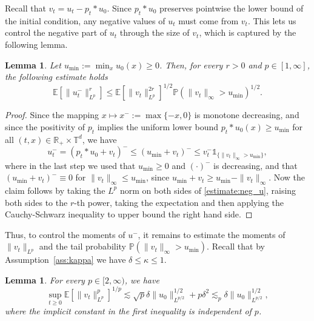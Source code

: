 \documentclass[a4paper,12pt]{article}
\newtheorem{lemma}[theorem]{Lemma}
\begin{document}
Recall that $v_t = u_t - p_t \ast u_0$. Since 
$p_t \ast u_0$ preserves pointwise the lower bound of the initial condition, 
any negative values of $u_t$ must come from $v_t$. This lets us control the negative part of $u_t$ through the size of $v_t$, which is captured by the following lemma. 

\begin{lemma}
  \label{lem:negative-u-moments}Let $u_{\min} := \min_x u_0 (x) \geq 0$. Then, for every $r > 0$ and $p \in [1,\infty]$, 
the following estimate holds
   \[ \mathbb{E} [\| u^-_t \|_{L^p}^r] \leq \mathbb{E} [\| v_t \|_{L^p}^{2
     r}]^{1 / 2} \mathbb{P} (\| v_t \|_{\infty} > u_{\min})^{1 / 2} . \]
\end{lemma}

\begin{proof}
    Since the mapping $x \mapsto x^-:=\max\{-x,0\}$ is monotone decreasing, 
  and since the positivity of $p_t$ implies the uniform lower bound $p_t \ast u_0 (x)\geq u_{\min}$ for all $(t,x) \in \mathbb R_+ \times \mathbb{T}^d$,
  we have 
  \begin{equation}\label{estimate:neg_u}
       u_t^- =(p_t \ast u_0 + v_t)^- \leq  (u_{\min} + v_t)^- \leq v_t^- \mathds{1}_{\{\|v_t\|_\infty > u_{\min}\}},
  \end{equation}
  where in the last step we used that $u_{\min}\ge 0$ and $(\cdot)^-$ is decreasing, and that $(u_{\min} + v_t)^- \equiv 0$ for $\| v_t \|_{\infty} \leq u_{\min}$, since $u_{\min} + v_t \geq u_{\min} - \| v_t \|_{\infty}$.
Now the claim follows by taking the $L^p$ norm on both sides of \eqref{estimate:neg_u}, raising both sides to the $r$-th power, taking the expectation and then applying the Cauchy-Schwarz inequality to upper bound the right hand side.
\end{proof}



Thus, to control the moments of $u^-$, it remains to estimate the moments of $\|v_t\|_{L^p}$ and the tail probability $\mathbb{P} (\| v_t \|_{\infty} > u_{\min}) $. Recall that by Assumption~\ref{ass:kappa} we have $\delta \le \kappa \leq 1$.

\begin{lemma}
  \label{lem:v-Lebesgue-moments}
For every $p \in [2, \infty)$, we have
\[ 
\sup_{t \geq 0}\mathbb{E} \left[\| v_t \|_{L^p}^p \right]^{1 / p} \lesssim \sqrt{p}\delta \|u_0\|^{1/2}_{L^{p/2}}+p\delta^2\lesssim_p \delta \| u_0 \|_{L^{p /
     2}}^{1 / 2} ,
     \]
where the implicit constant in the first inequality is independent of $p$.
\end{lemma}
\end{document}
